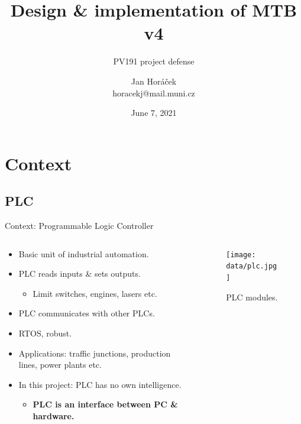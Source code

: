 \documentclass[aspectratio=169]{beamer}
\title[MTB v4]{Design \& implementation of MTB v4}
\subtitle{PV191 project defense}
\author[J. Horáček]{Jan Horáček\texorpdfstring{\\}{, }horacekj@mail.muni.cz}
\institute[FI MU]{Faculty of Informatics Masaryk University}
\date{June 7, 2021}
\begin{document}
\begin{frame}[plain]
\maketitle
\end{frame}

\section{Context}
\subsection{PLC}


\begin{frame}{Context: Programmable Logic Controller}
\begin{columns}
	\begin{column}{.6\textwidth}
		\begin{itemize}
		\item Basic unit of industrial automation.
		\item PLC reads inputs \& sets outputs.
			\begin{itemize}
			\item Limit switches, engines, lasers etc.
		\end{itemize}
		\item PLC communicates with other PLCs.
		\item RTOS, robust.
		\item Applications: traffic junctions, production lines, power plants etc.
		\item In this project: PLC has no own intelligence.
		\begin{itemize}
		\item \textbf{PLC is an interface between PC \& hardware.}
		\end{itemize}
		\end{itemize}
	\end{column}
	\begin{column}{.4\textwidth}
		\begin{figure}
		\texttt{[image: data/plc.jpg]}
		\caption{PLC modules.}
		\end{figure}
	\end{column}
\end{columns}
\end{frame}

\end{document}
